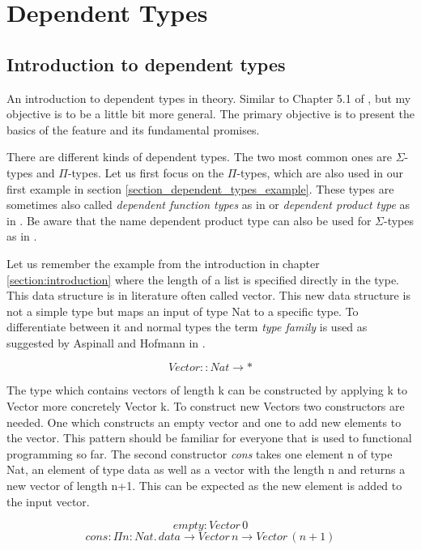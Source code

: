 \section{Dependent Types}
\subsection{Introduction to dependent types}
An introduction to dependent types in theory. Similar to Chapter 5.1 of \cite{10.1145/2841316}, but my objective is to be a little bit more general.
The primary objective is to present the basics of the feature and its fundamental promises.

There are different kinds of dependent types. The two most common ones are $\Sigma$-types and $\Pi$-types.
Let us first focus on the $\Pi$-types, which are also used in our first example in section \ref{section_dependent_types_example}. These types are sometimes also called \emph{dependent function types} as in \cite{10.1145/2841316} or \emph{dependent product type} as in \cite{10.5555/1076265}. Be aware that the name dependent product type can also be used for $\Sigma$-types as in \cite{10.1145/2841316}.

Let us remember the example from the introduction in chapter \ref{section:introduction} where the length of a list is specified directly in the type. This data structure is in literature \cite{10.1145/2841316} \cite{10.5555/1076265} often called vector.
This new data structure is not a simple type but maps an input of type Nat to a specific type. To differentiate between it and normal types the term \emph{type family} is used as suggested by Aspinall and Hofmann in \cite{10.5555/1076265}.

$$Vector :: Nat \rightarrow *$$

The type which contains vectors of length k can be constructed by applying k to Vector more concretely Vector k.
To construct new Vectors two constructors are needed. One which constructs an empty vector and one to add new elements to the vector. This pattern should be familiar for everyone that is used to functional programming so far.
The second constructor \emph{cons} takes one element n of type Nat, an element of type data as well as a vector with the length n and returns a new vector of length n+1. This can be expected as the new element is added to the input vector. 

$$empty: Vector \, 0$$
$$cons : \Pi n : Nat. \, data \rightarrow Vector \, n \rightarrow Vector \, (n+1)$$

